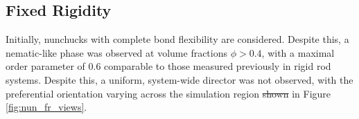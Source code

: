 \documentclass[11pt, a4paper]{article} %
\providecommand{\DIFadd}[1]{{\protect\color{blue}\uwave{#1}}} %
\providecommand{\DIFdel}[1]{{\protect\color{red}\sout{#1}}}                      %
\providecommand{\DIFaddbegin}{} %
\providecommand{\DIFaddend}{} %
\providecommand{\DIFdelbegin}{} %
\providecommand{\DIFdelend}{} %
\begin{document}

\subsection{Fixed Rigidity}

Initially, nunchucks with complete bond flexibility are considered. Despite this, a nematic-like phase was observed at volume fractions $\phi > 0.4$, with a maximal order parameter of \num{0.6} comparable to those measured previously in rigid rod systems. Despite this, a uniform, system-wide director was not observed, with the preferential orientation varying across the simulation region \DIFdelbegin \DIFdel{shown }\DIFdelend \DIFaddbegin \DIFadd{\textcolor{forestgreen}{shown} }\DIFaddend in Figure \ref{fig:nun_fr_views}.
\end{document}

